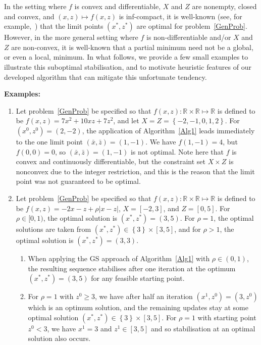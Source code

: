\documentclass[preprint, 1p, review]{elsarticle}
\newcommand{\braces}[1]{\left\{ #1 \right \}}
\begin{document}
In the setting where $f$ is convex and differentiable, $X$ and $Z$ are nonempty, closed and convex, and $(x,z) \mapsto f(x,z)$ is inf-compact, 
it is well-known (see, for example,~\cite{Bertsekas1999,GS2000,Tseng2001}) that the limit points $(x^*,z^*)$ are optimal for problem~\eqref{GenProb}.
However, in the more general setting where $f$ is non-differentiable and/or $X$ and $Z$ are non-convex, it is well-known that a partial minimum need not be a global, or even a local, minimum. 
In what follows, we provide a few small examples to illustrate this suboptimal stabilisation, and to motivate heuristic features of our developed algorithm that can mitigate this unfortunate tendency.

\noindent
\medskip
{\bf Examples:}
\begin{enumerate}
\item Let problem~\eqref{GenProb} be specified so that $f(x,z) : \mathbb{R} \times \mathbb{R} \mapsto \mathbb{R}$ is defined to be $f(x,z) = 7x^2 + 10xz + 7z^2$, and let $X = Z=\braces{-2,-1,0,1,2}$. For $(x^0,z^0)=(2,-2)$, the application of Algorithm~\ref{Alg1} leads immediately to the one limit point $(\bar{x},\bar{z})=(1,-1)$. We have $f(1,-1)=4$, but $f(0,0)=0$, so $(\bar{x},\bar{z})=(1,-1)$ is not optimal. Note here that $f$ is convex and continuously differentiable, but the constraint set $X \times Z$ is nonconvex due to the integer restriction, and this is the reason that the limit point was not guaranteed to be optimal.
\item Let problem~\eqref{GenProb} be specified so that $f(x,z) : \mathbb{R} \times \mathbb{R} \mapsto \mathbb{R}$ is defined to be $f(x,z) = -2x - z + \rho \left| x-z \right|$, $X=[-2,3]$, and $Z=[0,5]$.
For $\rho \in [0,1)$, the optimal solution is $(x^*,z^*)=(3,5)$. For $\rho = 1$, the optimal solutions are taken from $(x^*,z^*) \in \braces{3} \times [3,5]$, and for $\rho > 1$, the optimal solution is $(x^*,z^*) = (3,3)$.
\begin{enumerate}
\item When applying the GS approach of Algorithm~\ref{Alg1} with $\rho \in (0,1)$, the resulting sequence stabilises after one iteration at the optimum $(x^*,z^*) = (3,5)$ for any feasible starting point. 
\item For $\rho=1$ with $z^0 \ge 3$, we have after half an iteration $(x^1,z^0)=(3,z^0)$ which is an optimum solution, and the remaining updates stay at some optimal solution $(x^*,z^*) \in \braces{3} \times [3,5]$. For $\rho=1$ with starting point $z^0 < 3$, we have $x^1=3$ and $z^1 \in [3,5]$ and so stabilisation at an optimal solution also occurs. 

\end{enumerate}
\end{enumerate}
\end{document}
